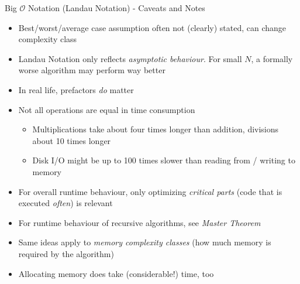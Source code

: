 
\begin{frame}{Big $\mathcal{O}$ Notation (Landau Notation) - Caveats and Notes}
%
\begin{itemize}
\item Best/worst/average case assumption often not (clearly) stated, can change complexity class
\item Landau Notation only reflects \emph{asymptotic behaviour}. For small $N$, a formally worse algorithm may perform way better
\item In real life, prefactors \emph{do} matter
\item Not all operations are equal in time consumption
	\begin{itemize}
	\item Multiplications take about four times longer than addition, divisions about 10 times longer
	\item Disk I/O might be up to 100 times slower than reading from / writing to memory
	\end{itemize}
\item For overall runtime behaviour, only optimizing \emph{critical parts} (\ie code that is executed \emph{often}) is relevant
\item For runtime behaviour of recursive algorithms, see \emph{Master Theorem}
\item Same ideas apply to \emph{memory complexity classes} (how much memory is required by the algorithm)
\item Allocating memory does take (considerable!) time, too
\end{itemize}
%
\end{frame}


